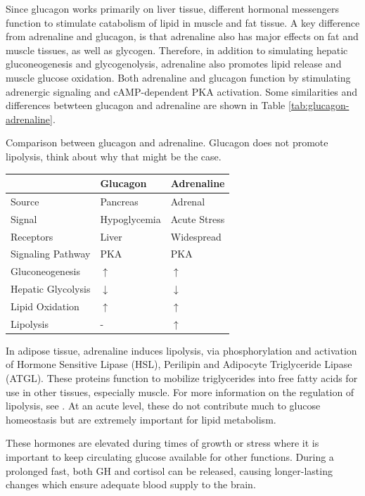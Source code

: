 \documentclass{tufte-handout}
\begin{document}
Since glucagon works primarily on liver tissue, different hormonal messengers function to stimulate catabolism of lipid in muscle and fat tissue.  A key difference from adrenaline and glucagon, is that adrenaline also has major effects on fat and muscle tissues, as well as glycogen.  Therefore, in addition to simulating hepatic gluconeogenesis and glycogenolysis, adrenaline also promotes lipid release and muscle glucose oxidation.  Both adrenaline and glucagon function by stimulating adrenergic signaling and cAMP-dependent PKA activation.  Some similarities and differences betwteen glucagon and adrenaline are shown in Table \ref{tab:glucagon-adrenaline}.

\begin{margintable}
\caption{Comparison between glucagon and adrenaline.  Glucagon does not promote lipolysis, think about why that might be the case.}
\label{tab:endocrine-glucose}
\begin{tabular}{@{}lll@{}}
 & \textbf{Glucagon}  & \textbf{Adrenaline}           \\ \midrule
Source & Pancreas & Adrenal \\ 
Signal & Hypoglycemia & Acute Stress \\ 
Receptors & Liver & Widespread \\ 
Signaling Pathway & PKA & PKA \\  
Gluconeogenesis & $\uparrow$ & $\uparrow$ \\  
Hepatic Glycolysis & $\downarrow$ & $\downarrow$ \\ 
Lipid Oxidation & $\uparrow$ & $\uparrow$ \\ 
Lipolysis & - & $\uparrow$\\ \bottomrule
\end{tabular}
\end{margintable}

In adipose tissue, adrenaline induces lipolysis, via phosphorylation and activation of Hormone Sensitive Lipase (HSL), Perilipin and Adipocyte Triglyceride Lipase (ATGL).  These proteins function to mobilize triglycerides into free fatty acids for use in other tissues, especially muscle.  For more information on the regulation of lipolysis, see \citep{Young2013}.  At an acute level, these do not contribute much to glucose homeostasis but are extremely important for lipid metabolism.

  These hormones are elevated during times of growth or stress where it is important to keep circulating glucose available for other functions.  During a prolonged fast, both GH and cortisol can be released, causing longer-lasting changes which ensure adequate blood supply to the brain.
\end{document}
